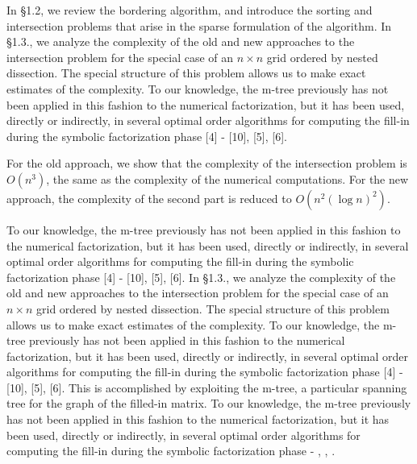 \documentclass[twoside,leqno,twocolumn]{article}
\begin{document}
In \S 1.2, we review the bordering algorithm, and introduce
the sorting and intersection problems that arise in the
sparse formulation of the algorithm.  
In \S 1.3., we analyze the complexity of the old and new
approaches to the intersection problem for the special case of
an $n \times n$ grid ordered by nested dissection. The special
structure of this problem allows us to make exact estimates of
the complexity. To our knowledge, the m-tree previously has not been applied in this
fashion to the numerical factorization, but it has been used,
directly or indirectly, in several optimal order algorithms for
computing the fill-in during the symbolic factorization phase
[4] - [10], [5], [6].


For the old approach, we show that the
complexity of the intersection problem is $O(n^{3})$, the same
as the complexity of the numerical computations.  For the
new approach, the complexity of the second part is reduced to
$O(n^{2} (\log n)^{2})$.  

To our knowledge, the m-tree previously has not been applied in this
fashion to the numerical factorization, but it has been used,
directly or indirectly, in several optimal order algorithms for
computing the fill-in during the symbolic factorization phase
[4] - [10], [5], [6]. In \S 1.3., we analyze the complexity of the old and new
approaches to the intersection problem for the special case of
an $n \times n$ grid ordered by nested dissection. The special
structure of this problem allows us to make exact estimates of
the complexity. To our knowledge, the m-tree previously has not been applied in this
fashion to the numerical factorization, but it has been used,
directly or indirectly, in several optimal order algorithms for
computing the fill-in during the symbolic factorization phase
[4] - [10], [5], [6].
This is accomplished by exploiting the m-tree,
a particular spanning tree for the graph of the filled-in matrix.
To our knowledge, the m-tree previously has not been applied in this
fashion to the numerical factorization, but it has been used,
directly or indirectly, in several optimal order algorithms for
computing the fill-in during the symbolic factorization phase
\cite{EISENSTAT} - \cite{LIU2}, \cite{ROSE76},  \cite{SCHREIBER}.
\end{document}
